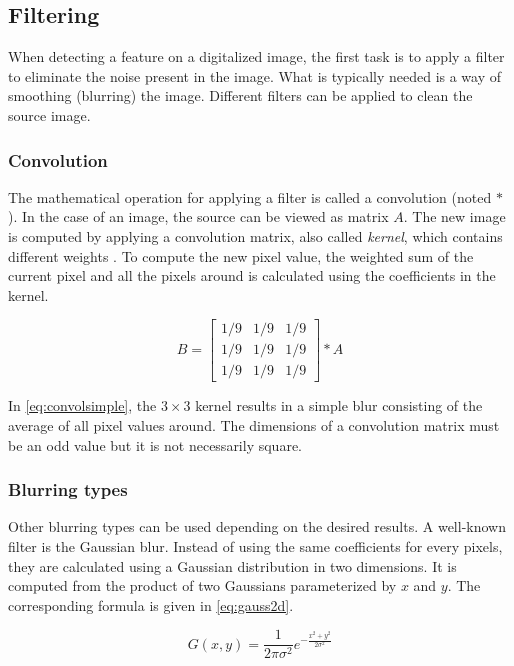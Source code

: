 \subsection{Filtering}

When detecting a feature on a digitalized image, the first task is to apply a filter to eliminate the noise present in the image. What is typically needed is a way of smoothing (blurring) the image. Different filters can be applied to clean the source image.

\subsubsection{Convolution}

The mathematical operation for applying a filter is called a convolution (noted $\ast$). In the case of an image, the source can be viewed as matrix $A$. The new image is computed by applying a convolution matrix, also called \emph{kernel}, which contains different weights . To compute the new pixel value, the weighted sum of the current pixel and all the pixels around is calculated using the coefficients in the kernel.

\begin{equation}
\label{eq:convolsimple}
B =
\begin{bmatrix}
1/9 & 1/9 & 1/9 \\
1/9 & 1/9 & 1/9 \\
1/9 & 1/9 & 1/9
\end{bmatrix}
\ast A
\end{equation}

In \eqref{eq:convolsimple}, the $3 \times 3$ kernel results in a simple blur consisting of the average of all pixel values around. The dimensions of a convolution matrix must be an odd value but it is not necessarily square.

\subsubsection{Blurring types}

Other blurring types can be used depending on the desired results. A well-known filter is the Gaussian blur. Instead of using the same coefficients for every pixels, they are calculated using a Gaussian distribution in two dimensions. It is computed from the product of two Gaussians parameterized by $x$ and $y$. The corresponding formula is given in \eqref{eq:gauss2d}.

\begin{equation}
\label{eq:gauss2d}
G(x,y) = \frac{1}{2\pi\sigma^2}e^{-\frac{x^2+y^2}{2\sigma^2}}
\end{equation}

